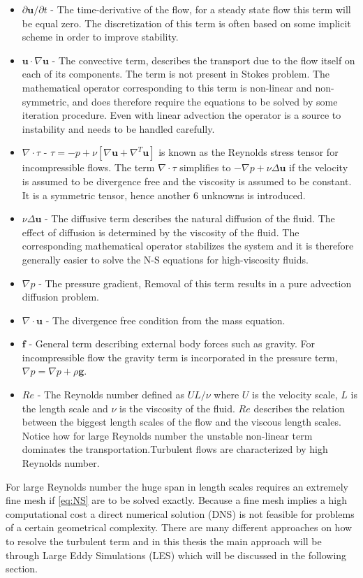 \begin{itemize}
    \item $\partial \mathbf{u} /\partial t$
     - The time-derivative of the flow, for a steady state flow this term will be equal zero.
             The discretization of this term is often based on some implicit scheme in order to improve stability.  
    \item $\mathbf{u} \cdot \nabla \mathbf{u}$
     - The convective term, describes the transport due to the flow itself on each of its components. 
    The term is not present in Stokes problem.
    The mathematical operator corresponding to this term is non-linear and non-symmetric, and does therefore require the equations to be solved 
    by some iteration procedure. Even with linear advection the operator is a source to instability and needs to be handled carefully. 
\item  $\nabla \cdot \tau$ 
       - $\tau= -p + \nu[ \nabla \mathbf{u} + \nabla^T \mathbf{u}]$ is known as the Reynolds stress tensor for incompressible flows.
       The term $\nabla \cdot \tau$ simplifies to $-\nabla p + \nu \Delta \mathbf{u}$ if the velocity is assumed to 
       be divergence free and the viscosity is assumed to be constant. 
       It is a symmetric tensor, hence another 6 unknowns is introduced.
    \item $\nu \Delta \mathbf{u}$ 
    - The diffusive term describes the natural diffusion of the fluid. The effect of diffusion is determined by the 
    viscosity of the fluid. The corresponding mathematical operator stabilizes the system and it is therefore generally easier
    to solve the N-S equations for high-viscosity fluids. 
    \item $\nabla p$
    - The pressure gradient, Removal of this term results in a pure advection diffusion problem.
    \item $\nabla \cdot \mathbf{u}$ 
    - The divergence free condition from the mass equation.
\item $\mathbf{f}$ 
    - General term describing external body forces such as gravity. For incompressible flow the
    gravity term is incorporated in the pressure term, $\nabla p = \nabla p + \rho \mathbf{g}$. 
    \item $Re$ 
    - The Reynolds number defined as $UL/\nu$ where $U$ is the velocity scale, $L$ is the length scale and $\nu$ 
      is the viscosity of the fluid. $Re$ describes the relation between the biggest length scales of the flow
      and the viscous length scales. Notice how for large Reynolds number the unstable non-linear term 
      dominates the transportation.Turbulent flows are characterized by high Reynolds number.
\end{itemize}
For large Reynolds number the huge span in length scales requires an extremely fine mesh if \ref{eq:NS} 
are to be solved exactly. Because a fine mesh implies a high computational cost a direct numerical solution (DNS) is not feasible for 
problems of a certain geometrical complexity. There are many different approaches on how to resolve the turbulent term and in 
this thesis the main approach will be through Large Eddy Simulations (LES) which will be discussed 
in the following section.
%
